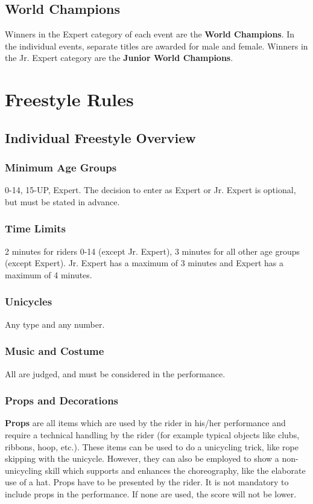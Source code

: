 \section{World Champions \label{sec:freestyle_world-champions}}
Winners in the Expert category of each event are the \textbf{World Champions}.
In the individual events, separate titles are awarded for male and female.
Winners in the Jr. Expert category are the \textbf{Junior World Champions}.

\chapter{Freestyle Rules}

\section{Individual Freestyle Overview}

\subsection{Minimum Age Groups}
 0-14, 15-UP, Expert.
The decision to enter as Expert or Jr. Expert is optional, but must be stated in advance.

\subsection{Time Limits}
2 minutes for riders 0-14 (except Jr. Expert), 3 minutes for all other age groups (except Expert).
Jr. Expert has a maximum of 3 minutes and Expert has a maximum of 4 minutes.

\subsection{Unicycles}
Any type and any number.

\subsection{Music and Costume}
All are judged, and must be considered in the performance.

\subsection{Props and Decorations \label{subsec:freestyle_freestyle-rules_individual-freestyle-overview_props-and-decorations}}

\textbf{Props} are all items which are used by the rider in his/her performance and require a technical handling by the rider (for example typical objects like clubs, ribbons, hoop, etc.). 
These items can be used to do a unicycling trick, like rope skipping with the unicycle.
However, they can also be employed to show a non-unicycling skill which supports and enhances the choreography, like the elaborate use of a hat.
Props have to be presented by the rider.
It is not mandatory to include props in the performance.
If none are used, the score will not be lower. 

